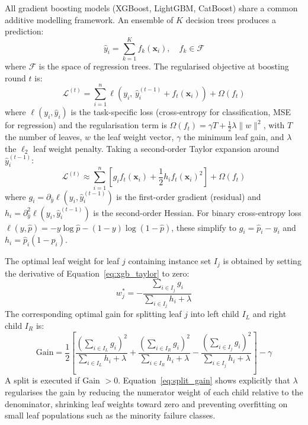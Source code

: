 All gradient boosting models (XGBoost, LightGBM, CatBoost) share a common additive modelling framework. An ensemble of $K$ decision trees produces a prediction:
\begin{equation}
    \hat{y}_i = \sum_{k=1}^{K} f_k(\mathbf{x}_i), \quad f_k \in \mathcal{F}
    \label{eq:gb_ensemble}
\end{equation}
where $\mathcal{F}$ is the space of regression trees. The regularised objective at boosting round $t$ is:
\begin{equation}
    \mathcal{L}^{(t)} = \sum_{i=1}^{n} \ell\!\left(y_i,\, \hat{y}_i^{(t-1)} + f_t(\mathbf{x}_i)\right) + \Omega(f_t)
    \label{eq:xgb_obj}
\end{equation}
where $\ell(y_i, \hat{y}_i)$ is the task-specific loss (cross-entropy for classification, MSE for regression) and the regularisation term is $\Omega(f_t) = \gamma T + \frac{1}{2}\lambda \|w\|^2$, with $T$ the number of leaves, $w$ the leaf weight vector, $\gamma$ the minimum leaf gain, and $\lambda$ the $\ell_2$ leaf weight penalty. Taking a second-order Taylor expansion around $\hat{y}^{(t-1)}_i$:
\begin{equation}
    \mathcal{L}^{(t)} \approx \sum_{i=1}^{n} \left[ g_i f_t(\mathbf{x}_i) + \frac{1}{2} h_i f_t(\mathbf{x}_i)^2 \right] + \Omega(f_t)
    \label{eq:xgb_taylor}
\end{equation}
where $g_i = \partial_{\hat{y}} \ell(y_i, \hat{y}^{(t-1)}_i)$ is the first-order gradient (residual) and $h_i = \partial^2_{\hat{y}} \ell(y_i, \hat{y}^{(t-1)}_i)$ is the second-order Hessian. For binary cross-entropy loss $\ell(y,\hat{p}) = -y\log\hat{p} - (1-y)\log(1-\hat{p})$, these simplify to $g_i = \hat{p}_i - y_i$ and $h_i = \hat{p}_i(1-\hat{p}_i)$.

The optimal leaf weight for leaf $j$ containing instance set $I_j$ is obtained by setting the derivative of Equation~\ref{eq:xgb_taylor} to zero:
\begin{equation}
    w_j^* = -\frac{\sum_{i \in I_j} g_i}{\sum_{i \in I_j} h_i + \lambda}
    \label{eq:optimal_leaf}
\end{equation}
The corresponding optimal gain for splitting leaf $j$ into left child $I_L$ and right child $I_R$ is:
\begin{equation}
    \text{Gain} = \frac{1}{2}\left[
        \frac{\left(\sum_{i \in I_L} g_i\right)^2}{\sum_{i \in I_L} h_i + \lambda}
        + \frac{\left(\sum_{i \in I_R} g_i\right)^2}{\sum_{i \in I_R} h_i + \lambda}
        - \frac{\left(\sum_{i \in I_j} g_i\right)^2}{\sum_{i \in I_j} h_i + \lambda}
    \right] - \gamma
    \label{eq:split_gain}
\end{equation}
A split is executed if Gain $> 0$. Equation~\ref{eq:split_gain} shows explicitly that $\lambda$ regularises the gain by reducing the numerator weight of each child relative to the denominator, shrinking leaf weights toward zero and preventing overfitting on small leaf populations such as the minority failure classes.

